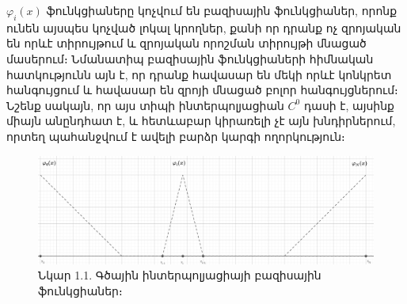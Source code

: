 \documentclass[fleqn, bachelor,subf,12pt,notitlepage]{article}
\begin{document}
$\varphi_{i}\left(x\right)$ ֆունկցիաները կոչվում են բազիսային ֆունկցիաներ, որոնք ունեն այսպես կոչված լոկալ կրողներ, քանի որ դրանք ոչ զրոյական են որևէ տիրույթում և զրոյական որոշման տիրույթի մնացած մասերում։
Նմանատիպ բազիսային ֆունկցիաների հիմնական հատկությունն այն է, որ դրանք հավասար են մեկի որևէ կոնկրետ հանգույցում և հավասար են զրոյի մնացած բոլոր հանգույցներում։ Նշենք սակայն, որ այս տիպի ինտերպոլյացիան $C^{0}$ դասի է, այսինք միայն անընդհատ է, և հետևաբար կիրառելի չէ այն խնդիրներում, որտեղ պահանջվում է ավելի բարձր կարգի ողորկություն։

\begin{figure}[h!]
\centering
\includegraphics[width=1.0\textwidth]{images/one_var_linear}
\captionsetup{labelformat=empty}
\caption{\hfill Նկար 1.1. Գծային ինտերպոլյացիայի բազիսային ֆունկցիաներ։}
\end{figure}


\newpage
\end{document}
